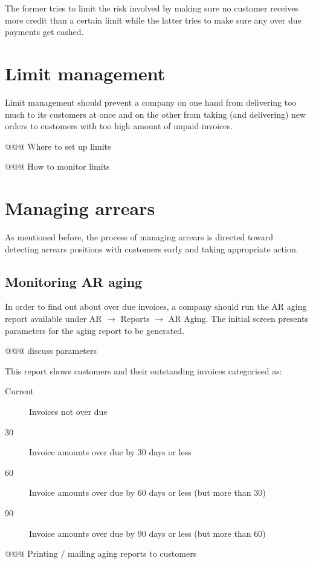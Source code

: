 The former tries to limit the risk involved by making sure no customer
receives more credit than a certain limit while the latter tries to
make sure any over due payments get cashed.

\section{Limit management}

Limit management should prevent a company on one hand from delivering too much
to its customers at once and on the other from taking (and delivering) new orders
to customers with too high amount of unpaid invoices.

@@@ Where to set up limits

@@@ How to monitor limits


\section{Managing arrears}

As mentioned before, the process of managing arrears is directed toward
detecting arrears positions with customers early and taking appropriate
action.


\subsection{Monitoring AR aging}

In order to find out about over due invoices, a company should run the AR
aging report available under AR $\rightarrow$ Reports $\rightarrow$ AR Aging.
The initial screen presents parameters for the aging report to be generated.

@@@ discuss parameters

This report shows customers and their outstanding invoices categorised as:

\begin{description}
\item [Current] Invoices not over due
\item [30] Invoice amounts over due by 30 days or less
\item [60] Invoice amounts over due by 60 days or less (but more than 30)
\item [90] Invoice amounts over due by 90 days or less (but more than 60)
\end{description}


@@@ Printing / mailing aging reports to customers


